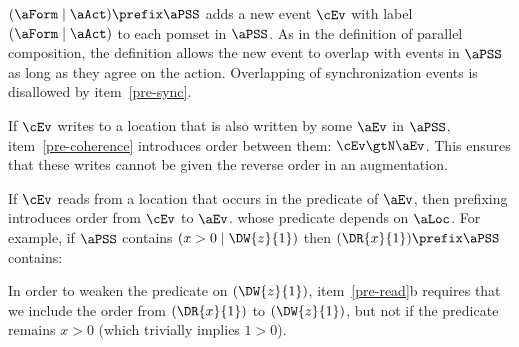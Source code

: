 \begin{definition}
\begin{enumerate}
\end{enumerate}
\end{definition}




$(\aForm \mid \aAct)\prefix\aPSS$ adds a new event $\cEv$ with label $(\aForm \mid \aAct)$ to each
pomset in $\aPSS$.  As in the definition of parallel composition, the
definition allows the new event to overlap with events in $\aPSS$ as long as
they agree on the action.  Overlapping of synchronization events is
disallowed by item~\ref{pre-sync}.

If $\cEv$ writes to a location that is also written by some $\aEv$ in $\aPSS$,
item~\ref{pre-coherence} introduces order between them: $\cEv \gtN \aEv$.  This
ensures that these writes cannot be given the reverse order in an augmentation.

If $\cEv$ reads from a location that occurs in the predicate of $\aEv$, then
prefixing introduces order from $\cEv$ to $\aEv$.
whose predicate depends on $\aLoc$. 
For example, if $\aPSS$ contains %
$(x>0 \mid \DW{z}{1})$
then $(\DR{x}{1})\prefix\aPSS$ contains:
\begin{displaymathsmall}
\begin{tikzcenter}[node distance=1em]
\end{tikzcenter}
\qquad{}\qquad
\begin{tikzcenter}[node distance=1em]
\end{tikzcenter}
\end{displaymathsmall}
In order to weaken the predicate on $(\DW{z}{1})$, item~\ref{pre-read}b
requires that we include the order from $(\DR{x}{1})$ to $(\DW{z}{1})$,
but not if the predicate remains $x>0$ (which trivially
implies $1>0$).

